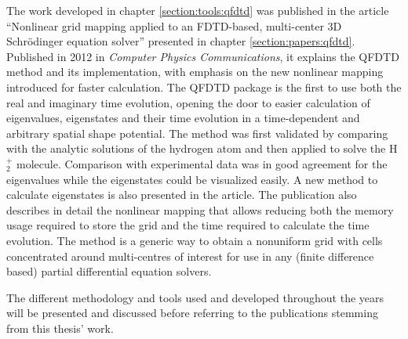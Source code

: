 The work developed in chapter \ref{section:tools:qfdtd} was published in the article
``Nonlinear grid mapping applied to an FDTD-based, multi-center 3D
Schr\"odinger equation solver'' presented in chapter \ref{section:papers:qfdtd}.
Published in 2012 in \textit{Computer Physics Communications}\cite{Bigaouette2011}, it
explains the QFDTD method and its implementation, with emphasis on the new
nonlinear mapping introduced for faster calculation. The QFDTD package is the
first to use both the real and imaginary time evolution, opening the door to
easier calculation of eigenvalues, eigenstates and their time evolution in a time-dependent
and arbitrary spatial shape potential.
The method was first validated by comparing with the analytic solutions of
the hydrogen atom and then applied to solve the H$_{2}^{+}$ molecule.
Comparison with experimental data was in good agreement for the eigenvalues
while the eigenstates could be visualized easily. A new method to calculate
eigenstates is also presented in the article. The publication also
describes in detail the nonlinear mapping that allows reducing both the memory
usage required to store the grid and the time required to calculate the time
evolution. The method is a generic way to obtain a nonuniform grid with cells
concentrated around multi-centres of interest for use in any (finite difference
based) partial differential equation solvers.

The different
methodology and tools used and developed throughout the years will be presented
and discussed before referring to the publications stemming from this thesis' work.


